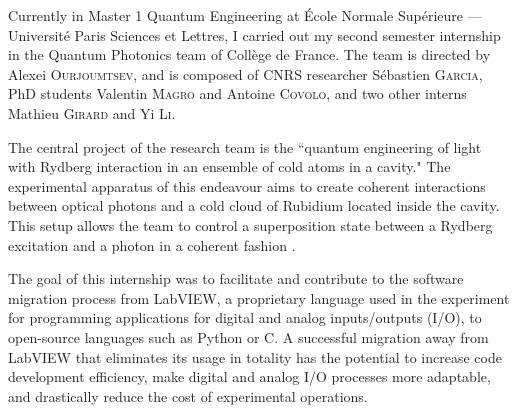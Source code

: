 Currently in Master 1 Quantum Engineering at École Normale Supérieure — Université Paris Sciences et Lettres, I carried out my second semester internship in the Quantum Photonics team of Collège de France. The team is directed by Alexei \textsc{Ourjoumtsev}, and is composed of CNRS researcher Sébastien \textsc{Garcia}, PhD students Valentin \textsc{Magro} and Antoine \textsc{Covolo}, and two other interns Mathieu \textsc{Girard} and Yi \textsc{Li}.

The central project of the research team is the ``quantum engineering of light with Rydberg interaction in an ensemble of cold atoms in a cavity." The experimental apparatus of this endeavour aims to create coherent interactions between optical photons and a cold cloud of Rubidium located inside the cavity. This setup allows the team to control a superposition state between a Rydberg excitation and a photon in a coherent fashion \cite{vaneecloo2022}.

The goal of this internship was to facilitate and contribute to the software migration process from  LabVIEW, a proprietary language used in the experiment for programming applications for digital and analog inputs/outputs (I/O), to open-source languages such as Python or C. A successful migration away from LabVIEW that eliminates its usage in totality has the potential to increase code development efficiency, make digital and analog I/O processes more adaptable, and drastically reduce the cost of experimental operations.
